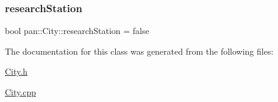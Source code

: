 \subsubsection{\texorpdfstring{research\+Station}{researchStation}}
{\footnotesize\ttfamily bool pan\+::\+City\+::research\+Station = false}



The documentation for this class was generated from the following files\+:\begin{DoxyCompactItemize}
\item 
\hyperlink{_city_8h}{City.\+h}\item 
\hyperlink{_city_8cpp}{City.\+cpp}\end{DoxyCompactItemize}

